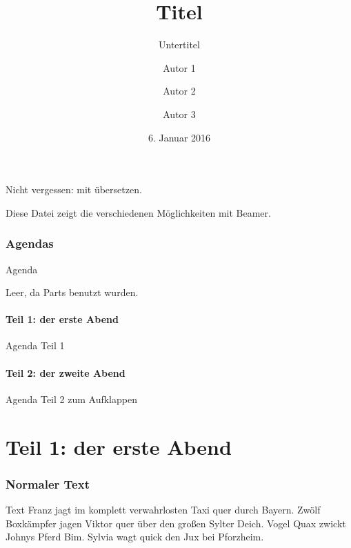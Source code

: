 \documentclass[t, aspectratio=169, ngerman]{beamer}
\title{Titel}
\subtitle{Untertitel}
\author{Autor 1 \and Autor 2 \and Autor 3}
\date{6. Januar 2016}
\begin{document}
	\frame{\titlepage}

	\begin{frame}
		Nicht vergessen: mit  übersetzen.

		Diese Datei zeigt die verschiedenen Möglichkeiten mit Beamer.
	\end{frame}

	\section*{Agendas}

	\begin{frame}{Agenda}
		\tableofcontents

		Leer, da Parts benutzt wurden.
	\end{frame}

	\subsection*{Teil 1: der erste Abend}

	\begin{frame}{Agenda Teil 1}
		\tableofcontents[part=1]
	\end{frame}

	\subsection*{Teil 2: der zweite Abend}

	\begin{frame}{Agenda Teil 2 zum Aufklappen}
		\tableofcontents[part=2, pausesections]
	\end{frame}

	\part{Teil 1: der erste Abend}

	\frame{\partpage}

	\section{Normaler Text}

	\begin{frame}{Text}
		Franz jagt im komplett verwahrlosten Taxi quer durch Bayern.
		Zwölf Boxkämpfer jagen Viktor quer über den großen Sylter Deich.
		Vogel Quax zwickt Johnys Pferd Bim.
		Sylvia wagt quick den Jux bei Pforzheim.
	\end{frame}
\end{document}
